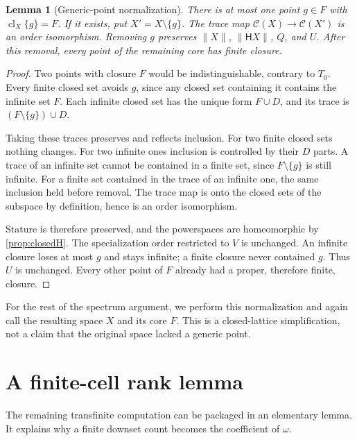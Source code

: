 \documentclass[11pt,a4paper]{article}
\newtheorem{lemma}[lemma]{Lemma}
\theoremstyle{definition}
\newcommand{\Cl}{\mathcal C}
\newcommand{\HH}{\mathsf H}
\newcommand{\st}[1]{\lVert #1\rVert}
\newcommand{\cl}{\operatorname{cl}}
\numberwithin{equation}{section}
\begin{document}
\begin{lemma}[Generic-point normalization]\label{lem:generic}
There is at most one point $g\in F$ with $\cl_X\{g\}=F$.  If it exists,
put $X'=X\setminus\{g\}$.  The trace map
$\Cl(X)\to\Cl(X')$ is an order isomorphism.  Removing $g$ preserves
$\st X$, $\st{\HH X}$, $Q$, and $U$.  After this removal, every point of
the remaining core has finite closure.
\end{lemma}
\begin{proof}
Two points with closure $F$ would be indistinguishable, contrary to
$T_0$.  Every finite closed set avoids $g$, since any closed set
containing it contains the infinite set $F$.  Each infinite closed set
has the unique form $F\cup D$, and its trace is
$(F\setminus\{g\})\cup D$.

Taking these traces preserves and reflects inclusion.  For two finite
closed sets nothing changes.  For two infinite ones inclusion is
controlled by their $D$ parts.  A trace of an infinite set cannot be
contained in a finite set, since $F\setminus\{g\}$ is still infinite.
For a finite set contained in the trace of an infinite one, the same
inclusion held before removal.  The trace map is onto the closed sets
of the subspace by definition, hence is an order isomorphism.

Stature is therefore preserved, and the powerspaces are homeomorphic
by \cref{prop:closedH}.  The specialization order restricted to $V$ is
unchanged.  An infinite closure loses at most $g$ and stays infinite;
a finite closure never contained $g$.  Thus $U$ is unchanged.  Every
other point of $F$ already had a proper, therefore finite, closure.
\end{proof}

For the rest of the spectrum argument, we perform this normalization
and again call the resulting space $X$ and its core $F$.  This is a
closed-lattice simplification, not a claim that the original space
lacked a generic point.

\section{A finite-cell rank lemma}
\label{sec:cells}

The remaining transfinite computation can be packaged in an elementary
lemma.  It explains why a finite downset count becomes the coefficient
of $\omega$.
\end{document}
